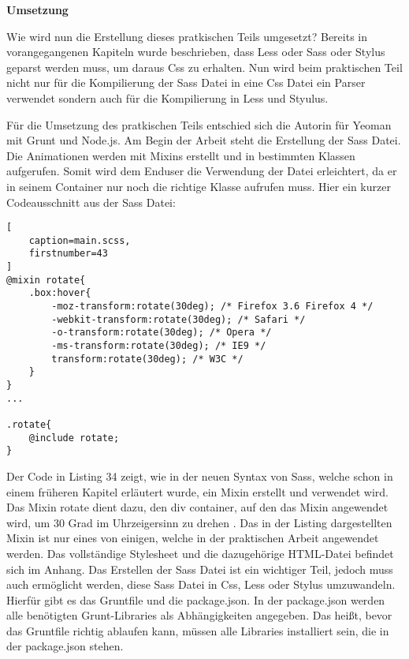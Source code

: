 \textbf{Umsetzung}

Wie wird nun die Erstellung dieses pratkischen Teils umgesetzt? \newline
Bereits in vorangegangenen Kapiteln wurde beschrieben, dass Less oder Sass oder Stylus geparst werden muss, um daraus Css zu erhalten. Nun wird beim praktischen Teil nicht nur für die Kompilierung der Sass Datei in eine Css Datei ein Parser verwendet sondern auch für die Kompilierung in Less und Styulus.

Für die Umsetzung des pratkischen Teils entschied sich die Autorin für Yeoman mit Grunt und Node.js.\newline
Am Begin der Arbeit steht die Erstellung der Sass Datei. Die Animationen werden mit Mixins erstellt und in bestimmten Klassen aufgerufen. Somit wird dem Enduser die Verwendung der Datei erleichtert, da er in seinem Container nur noch die richtige Klasse aufrufen muss.
Hier ein kurzer Codeausschnitt aus der Sass Datei:
\begin{lstlisting}[
	caption=main.scss,
	firstnumber=43
]
@mixin rotate{
	.box:hover{
		-moz-transform:rotate(30deg); /* Firefox 3.6 Firefox 4 */
		-webkit-transform:rotate(30deg); /* Safari */
		-o-transform:rotate(30deg); /* Opera */
		-ms-transform:rotate(30deg); /* IE9 */
		transform:rotate(30deg); /* W3C */
	}
}
...

.rotate{
	@include rotate;
}

\end{lstlisting}
Der Code in Listing 34 zeigt, wie in der neuen Syntax von Sass, welche schon in einem früheren Kapitel erläutert wurde, ein Mixin erstellt und verwendet wird. \newline
Das Mixin rotate dient dazu, den div container, auf den das Mixin angewendet wird, um 30 Grad im Uhrzeigersinn zu drehen . Das in der Listing dargestellten Mixin ist nur eines von einigen, welche in der praktischen Arbeit angewendet werden. Das vollständige Stylesheet und die dazugehörige HTML-Datei befindet sich im Anhang. \newline\newline
Das Erstellen der Sass Datei ist ein wichtiger Teil, jedoch muss auch ermöglicht werden, diese Sass Datei in Css, Less oder Stylus umzuwandeln. Hierfür gibt es das Gruntfile und die package.json.
In der package.json werden alle benötigten Grunt-Libraries als Abhängigkeiten angegeben. Das heißt, bevor das Gruntfile richtig ablaufen kann, müssen alle Libraries installiert sein, die in der package.json stehen.\newline
